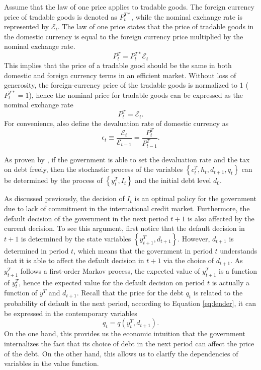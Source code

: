 Assume that the law of one price applies to tradable goods. The foreign currency price of tradable goods is denoted as $P^{T*}_t$, while the nominal exchange rate is represented by $\mathcal{E}_t$. The law of one price states that the price of tradable goods in the domestic currency is equal to the foreign currency price multiplied by the nominal exchange rate.
\begin{equation*}
    P^T_t = P^{T*}_t \mathcal{E}_t
\end{equation*}
This implies that the price of a tradable good should be the same in both domestic and foreign currency terms in an efficient market. Without loss of generosity, the foreign-currency price of the tradable goods is normalized to 1 ($P^{T*}_t = 1$), hence the nominal price for tradable goods can be expressed as the nominal exchange rate
\begin{equation}
    \label{eq:price-exrate}
    P^T_t = \mathcal{E}_t.
\end{equation}
For convenience, also define the devaluation rate of domestic currency as
\begin{equation}
    \label{eq:devaluation-rate}
    \epsilon_t \equiv \frac{\mathcal{E}_t}{\mathcal{E}_{t-1}} = \frac{P^T_t}{P^T_{t-1}}.
\end{equation}

As proven by \citet*{Na-18}, if the government is able to set the devaluation rate and the tax on debt freely, then the stochastic process of the variables $\left\{ c^T_t, h_t, d_{t+1}, q_t \right\}$ can be determined by the process of $\left\{ y^T_t, I_t\right\}$ and the initial debt level $d_0$.

As discussed previously, the decision of $I_t$ is an optimal policy for the government due to lack of commitment in the international credit market. Furthermore, the default decision of the government in the next period $t+1$ is also affected by the current decision. To see this argument, first notice that the default decision in $t+1$ is determined by the state variables $\left\{ y^T_{t+1}, d_{t+1} \right\}$. However, $d_{t+1}$ is determined in period $t$, which means that the government in period $t$ understands that it is able to affect the default decision in $t+1$ via the choice of $d_{t+1}$. As $y^T_{t+1}$ follows a first-order Markov process, the expected value of $y^T_{t+1}$ is a function of $y^T_t$, hence the expected value for the default decision on period $t$ is actually a function of $y^T$ and $d_{t+1}$. Recall that the price for the debt $q_t$ is related to the probability of default in the next period, according to Equation \eqref{eq:lender}, it can be expressed in the contemporary variables
\begin{equation}
    q_t = q(y^T_t, d_{t+1}).
\end{equation}
On the one hand, this provides us the economic intuition that the government internalizes the fact that its choice of debt in the next period can affect the price of the debt. On the other hand, this allows us to clarify the dependencies of variables in the value function.